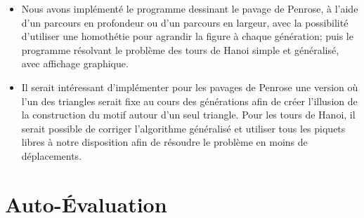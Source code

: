 \documentclass[a4paper, 11pt]{article}%
\begin{document}
	\begin{itemize}
		\item Nous avons implémenté le programme dessinant le pavage de
		Penrose, à l'aide d'un parcours en profondeur ou d'un parcours
		en largeur, avec la possibilité d'utiliser une homothétie pour
		agrandir la figure à chaque génération; puis le programme résolvant
		le problème des tours de Hanoi simple et généralisé, avec affichage
		graphique.
		\item Il serait intéressant d'implémenter pour les pavages de Penrose
		une version où l'un des triangles serait fixe au cours des générations
		afin de créer l'illusion de la construction du motif autour d'un
		seul triangle.
		Pour les tours de Hanoi, il serait possible de corriger l'algorithme
		généralisé et utiliser tous les piquets libres à notre disposition
		afin de résoudre le problème en moins de déplacements.
	\end{itemize}

\appendix

\section*{Auto-Évaluation}
\end{document}
